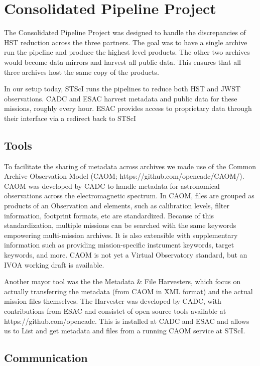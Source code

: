 \documentclass[11pt,twoside]{article}
\begin{document}
\section{Consolidated Pipeline Project}

The Consolidated Pipeline Project was designed to handle the discrepancies of HST reduction across the three partners. 
The goal was to have a single archive run the pipeline and produce the highest level products. 
The other two archives would become data mirrors and harvest all public data. 
This ensures that all three archives host the same copy of the products. 

In our setup today, STScI runs the pipelines to reduce both HST and JWST observations. 
CADC and ESAC harvest metadata and public data for these missions, roughly every hour. 
ESAC provides access to proprietary data through their interface via a redirect back to STScI

\subsection{Tools}

To facilitate the sharing of metadata across archives we made use of the Common Archive Observation Model (CAOM; https://github.com/opencadc/CAOM/). 
CAOM was developed by CADC to handle metadata for astronomical observations across the electromagnetic spectrum. 
In CAOM, files are grouped as products of an Observation and elements, such as calibration levels, filter information, footprint formats, etc are standardized. 
Because of this standardization, multiple missions can be searched with the same keywords empowering multi-mission archives. 
It is also extensible with supplementary information such as providing mission-specific instrument keywords, target keywords, and more. 
CAOM is not yet a Virtual Observatory standard, but an IVOA working draft is available. 

Another mayor tool was the the Metadata \& File Harvesters, which focus on actually transferring the metadata (from CAOM in XML format) and the actual mission files themselves. 
The Harvester was developed by CADC, with contributions from ESAC and consistet of open source tools available at https://github.com/opencadc. 
This is installed at CADC and ESAC and allows us to List and get metadata and files from a running CAOM service at STScI. 

\subsection{Communication}
\end{document}
